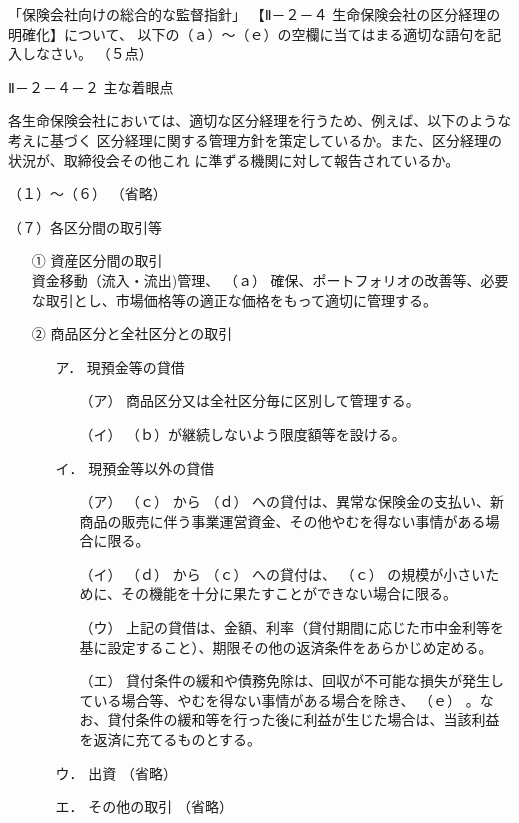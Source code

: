 \documentclass[report,gutter=10mm,fore-edge=10mm,uplatex,dvipdfmx]{jlreq}
\begin{document}
「保険会社向けの総合的な監督指針」
【Ⅱ－２－４ 生命保険会社の区分経理の明確化】について、
以下の（ａ）～（ｅ）の空欄に当てはまる適切な語句を記入しなさい。
（５点）

Ⅱ－２－４－２ 主な着眼点

各生命保険会社においては、適切な区分経理を行うため、例えば、以下のような考えに基づく
区分経理に関する管理方針を策定しているか。また、区分経理の状況が、取締役会その他これ
に準ずる機関に対して報告されているか。

（１）〜（６） （省略）

（７）各区分間の取引等
\begin{itemize}
\item[①] 資産区分間の取引\\
資金移動（流入・流出)管理、 （ａ） 確保、ポートフォリオの改善等、必要な取引とし、市場価格等の適正な価格をもって適切に管理する。
\item[②]商品区分と全社区分との取引\\
\begin{itemize}
\item[ア．] 現預金等の貸借
\begin{itemize}
\item[（ア）] 商品区分又は全社区分毎に区別して管理する。
\item[（イ）] （ｂ）が継続しないよう限度額等を設ける。
\end{itemize}
\item[イ．] 現預金等以外の貸借
\begin{itemize}
\item[（ア）]  （ｃ） から （ｄ） への貸付は、異常な保険金の支払い、新商品の販売に伴う事業運営資金、その他やむを得ない事情がある場合に限る。
\item[（イ）]  （ｄ） から （ｃ） への貸付は、 （ｃ） の規模が小さいために、その機能を十分に果たすことができない場合に限る。
\item[（ウ）] 上記の貸借は、金額、利率（貸付期間に応じた市中金利等を基に設定すること）、期限その他の返済条件をあらかじめ定める。
\item[（エ）] 貸付条件の緩和や債務免除は、回収が不可能な損失が発生している場合等、やむを得ない事情がある場合を除き、 （ｅ） 。なお、貸付条件の緩和等を行った後に利益が生じた場合は、当該利益を返済に充てるものとする。
\end{itemize}
\item[ウ．] 出資 （省略）
\item[エ．] その他の取引 （省略）
\end{itemize}
\end{itemize}
\end{document}

